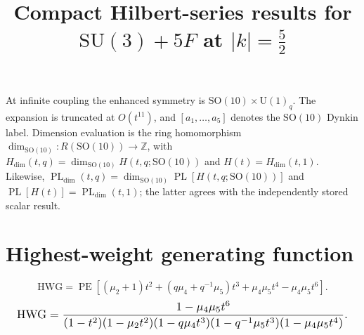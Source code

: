 \documentclass[10pt]{article}
\title{Compact Hilbert-series results for $\mathrm{SU(3)}+5F$ at $\lvert k\rvert=\frac{5}{2}$}
\date{}
\newcommand{\PE}{\operatorname{PE}}
\begin{document}
\maketitle
At infinite coupling the enhanced symmetry is $\mathrm{SO}(10)\times\mathrm{U}(1)_q$.
The expansion is truncated at $O(t^{11})$, and
$[a_1,\ldots,a_{5}]$ denotes the $\mathrm{SO}(10)$ Dynkin label.
Dimension evaluation is the ring homomorphism
$\dim_{\mathrm{SO}(10)}:R(\mathrm{SO}(10))\to\mathbb{Z}$, with
$H_{\mathrm{dim}}(t,q)=\dim_{\mathrm{SO}(10)}H(t,q;\mathrm{SO}(10))$
and $H(t)=H_{\mathrm{dim}}(t,1)$.  Likewise,
$\operatorname{PL}_{\mathrm{dim}}(t,q)=\dim_{\mathrm{SO}(10)}
\operatorname{PL}[H(t,q;\mathrm{SO}(10))]$ and
$\operatorname{PL}[H(t)]=\operatorname{PL}_{\mathrm{dim}}(t,1)$;
the latter agrees with the independently stored scalar result.

\section{Highest-weight generating function}
\begin{equation}
\mathrm{HWG}=\PE\!\left[(\mu_2+1)t^2+(q\mu_4+q^{-1}\mu_5)t^3
+\mu_4\mu_5t^4-\mu_4\mu_5t^6\right].
\end{equation}
\begin{equation}
\resizebox{0.98\linewidth}{!}{${\displaystyle
\mathrm{HWG}=\frac{1-\mu_4\mu_5t^6}
{(1-t^2)(1-\mu_2t^2)(1-q\mu_4t^3)(1-q^{-1}\mu_5t^3)(1-\mu_4\mu_5t^4)}.}$}
\end{equation}
\end{document}
